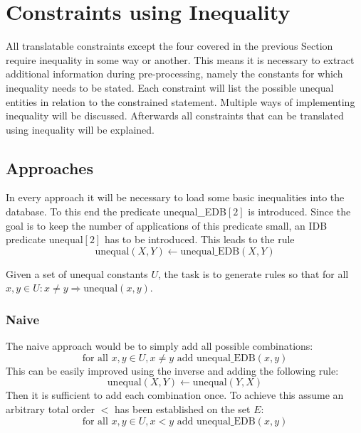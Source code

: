 \documentclass[hyperref,bachelorofscience,fleqn]{cgvpub}
\begin{document}
\section{Constraints using Inequality}\label{sec_constraints_using_inequality}
All translatable constraints except the four covered in the previous Section require inequality in some way or another. This means it is necessary to extract additional information during pre-processing, namely the constants for which inequality needs to be stated. Each constraint will list the possible unequal entities in relation to the constrained statement. Multiple ways of implementing inequality will be discussed. Afterwards all constraints that can be translated using inequality will be explained.

\subsection{Approaches}
In every approach it will be necessary to load some basic inequalities into the database. To this end the predicate unequal\_EDB\([2]\) is introduced. Since the goal is to keep the number of applications of this predicate small, an IDB predicate unequal\([2]\) has to be introduced. This leads to the rule
\begin{equation*}
\text{unequal}(X, Y) \leftarrow \text{unequal\_EDB}(X, Y)
\end{equation*}

Given a set of unequal constants \(U\), the task is to generate rules so that for all \( x, y \in U: x \ne y \Rightarrow \text{unequal}(x, y)\).

\subsubsection{Naive}\label{subsubsec_naive}
The naive approach would be to simply add all possible combinations:
\begin{equation*}
\text{for all } x, y \in U, x \ne y \text{ add } \text{unequal\_EDB}(x, y)
\end{equation*}
This can be easily improved using the inverse and adding the following rule:
\begin{equation}\label{equ_inverse}
\text{unequal}(X, Y) \leftarrow \text{unequal}(Y, X)
\end{equation}
Then it is sufficient to add each combination once. To achieve this assume an arbitrary total order \(<\) has been established on the set \(E\):
\begin{equation*}
\text{for all } x, y \in U, x < y \text{ add } \text{unequal\_EDB}(x, y)
\end{equation*}
\end{document}
